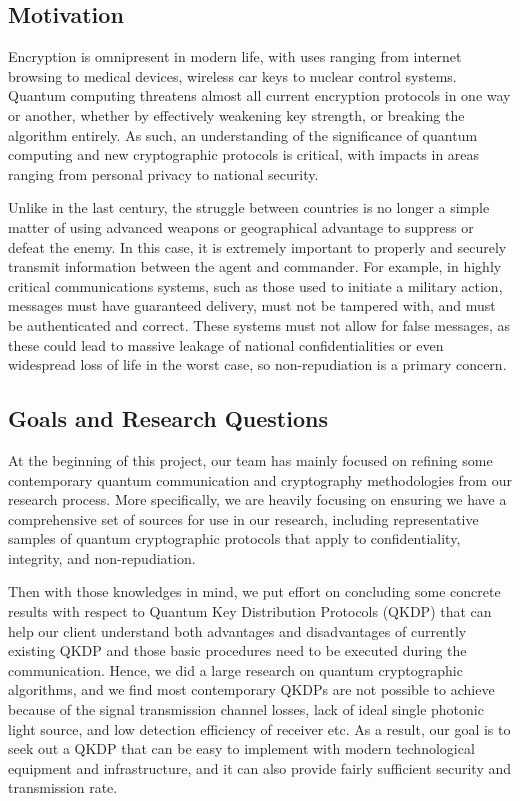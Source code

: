 \documentclass[sigconf]{acmart}
\begin{document}
\subsection{Motivation}
Encryption is omnipresent in modern life, with uses ranging from internet browsing to medical devices, wireless car keys to nuclear control systems. Quantum computing threatens almost all current encryption protocols in one way or another, whether by effectively weakening key strength, or breaking the algorithm entirely. As such, an understanding of the significance of quantum computing and new cryptographic protocols is critical, with impacts in areas ranging from personal privacy to national security.

Unlike in the last century, the struggle between countries is no longer a simple matter of using advanced weapons or geographical advantage to suppress or defeat the enemy. 
In this case, it is extremely important to properly and securely transmit information between the agent and commander. 
For example, in highly critical communications systems, such as those used to initiate a military action, messages must have guaranteed delivery, must not be tampered with, and must be authenticated and correct. These systems must not allow for false messages, as these could lead to massive leakage of national confidentialities or even widespread loss of life in the worst case, so non-repudiation is a primary concern.
 
\subsection{Goals and Research Questions}
At the beginning of this project, our team has mainly focused on refining some contemporary quantum communication and cryptography methodologies from our research process. More specifically, we are heavily focusing on ensuring we have a comprehensive set of sources for use in our research, including representative samples of quantum cryptographic protocols that apply to confidentiality, integrity, and non-repudiation.

Then with those knowledges in mind, we put effort on concluding some concrete results with respect to Quantum Key Distribution Protocols (QKDP) that can help our client understand both advantages and disadvantages of currently existing QKDP and those basic procedures need to be executed during the communication. Hence, we did a large research on quantum cryptographic algorithms, and we find most contemporary QKDPs are not possible to achieve because of the signal transmission channel losses, lack of ideal single photonic light source, and low detection efficiency of receiver etc. As a result, our goal is to seek out a QKDP that can be easy to implement with modern technological equipment and infrastructure, and it can also provide fairly sufficient security and transmission rate. 
\end{document}
